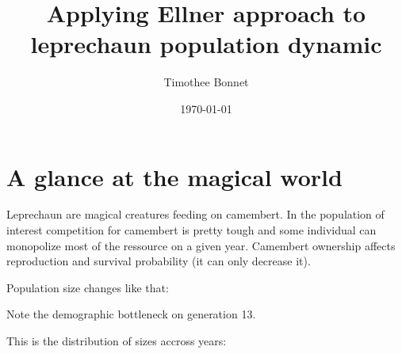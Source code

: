 \documentclass{article}\usepackage{knitr}
\begin{document}
\title{Applying Ellner approach to leprechaun population dynamic}
\date{\today}
\author{Timothee Bonnet}
\maketitle

\section{A glance at the magical world}


Leprechaun are magical creatures feeding on camembert. In the population of interest competition for camembert is pretty tough and some individual can monopolize most of the ressource on a given year. Camembert ownership affects reproduction and survival probability (it can only decrease it).
\begin{knitrout}
\color{fgcolor}\begin{kframe}


{\ttfamily\noindent\color{warningcolor}{\#\# Warning: cannot open file 'pop1.csv': No such file or directory}}

{\ttfamily\noindent\bfseries\color{errorcolor}{\#\# Error: cannot open the connection}}\end{kframe}
\end{knitrout}


Population size changes like that:
\begin{knitrout}
\color{fgcolor}\begin{kframe}


{\ttfamily\noindent\bfseries\color{errorcolor}{\#\# Error: object 'popfile' not found}}

{\ttfamily\noindent\bfseries\color{errorcolor}{\#\# Error: object 'popsize' not found}}\end{kframe}
\end{knitrout}

Note the demographic bottleneck on generation 13.

This is the distribution of sizes accross years:
\begin{knitrout}
\color{fgcolor}\begin{kframe}


{\ttfamily\noindent\bfseries\color{errorcolor}{\#\# Error: object 'popfile' not found}}\end{kframe}
\end{knitrout}
\end{document}
